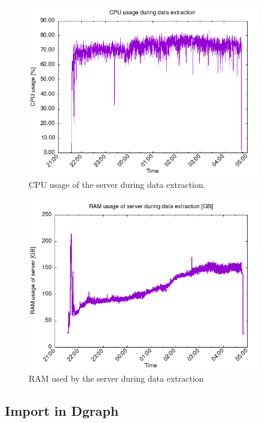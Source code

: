 \begin{figure}[H]
    \centering
    \includegraphics[width=0.9\textwidth]{Figures/results/cpu-usage-extraction.png}
    \caption{CPU usage of the server during data extraction.}
    \label{fig:cpu-usage-extraction}
\end{figure}

\begin{figure}[H]
    \centering
    \includegraphics[width=0.9\textwidth]{Figures/results/ram-usage-extraction.png}
    \caption{RAM used by the server during data extraction}
    \label{fig:ram-usage-extraction}
\end{figure}

\subsection{Import in Dgraph}


